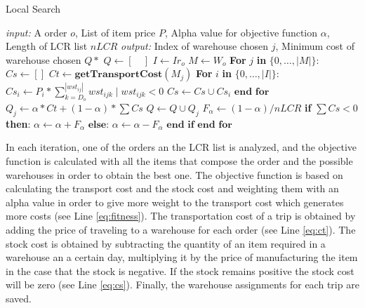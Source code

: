 \documentclass[letterpaper]{article} %
\begin{document}
\begin{algorithm}[H] \label{code:LocalSearch}
    \caption{Local Search}
    \begin{algorithmic}[1]
        \STATE \textit{input: } A order $o$, List of item price $P$, Alpha value for objective function $\alpha$, Length of LCR list $nLCR$
        \STATE \textit{output: } Index of warehouse chosen $j$, Minimum cost of warehouse chosen $Q*$
        \STATE  $Q \longleftarrow [\quad]$
        \STATE  $I \longleftarrow Ir_{o}$
        \STATE  $M \longleftarrow W_{o}$
        \STATE  \textbf{For} $j$ \textbf{in} $\{ 0,\dots,|M|\}$:
        \STATE  \quad $Cs \longleftarrow []$
        \STATE  \quad $Ct \longleftarrow \textbf{getTransportCost}(M_j) $ \label{eq:ct}
        \STATE  \quad \textbf{For} $i$ \textbf{in} $\{ 0,\dots,|I|\}$:
        \STATE  \quad \quad $Cs_i \longleftarrow P_i * \sum_{k=D_{o}}^{|wst_{ij}|} wst_{ijk}\; |\; wst_{ijk} < 0 $ 
        \STATE  \quad \quad$Cs \longleftarrow Cs \cup Cs_i $ \label{eq:cs}
        \STATE  \quad  $\textbf{end for}$
        \STATE  \quad $Q_j \longleftarrow \alpha * Ct + (1 - \alpha) * \sum Cs$ \label{eq:fitness}
        \STATE  \quad $Q \longleftarrow Q \cup Q_j$ \label{eq:fitness}
        \STATE  \quad $F_{\alpha}  \longleftarrow (1-\alpha) / nLCR$ \label{eq:fitness}
        \STATE  \quad \textbf{if} $\sum Cs < 0$ \textbf{then}:
        \STATE  \quad \quad $\alpha \longleftarrow \alpha + F_{\alpha}$
        \STATE  \quad $\textbf{else:}$
        \STATE  \quad \quad $\alpha \longleftarrow \alpha - F_{\alpha}$
        \STATE  \quad $\textbf{end if}$
        \STATE  $\textbf{end for}$
    \end{algorithmic}
\end{algorithm}

In each iteration, one of the orders an the LCR list is analyzed, and the objective function is calculated with all the items that compose the order and the possible warehouses in order to obtain the best one. The objective function is based on calculating the transport cost and the stock cost and weighting them with an alpha value in order to give more weight to the transport cost which generates more costs (see Line \ref{eq:fitness}).
The transportation cost of a trip is obtained by adding the price of traveling to a warehouse for each order (see Line \ref{eq:ct}). The stock cost is obtained by subtracting the quantity of an item required in a warehouse an a certain day, multiplying it by the price of manufacturing the item in the case that the stock is negative. If the stock remains positive the stock cost will be zero (see Line \ref{eq:cs}). Finally, the warehouse assignments for each trip are saved.
\end{document}
